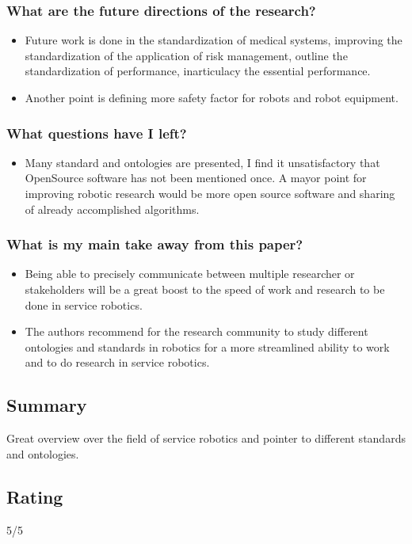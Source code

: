     \subsubsection*{What are the future directions of the research?}
    \begin{itemize}
        \item Future work is done in the standardization of medical systems, improving the standardization of the application of risk management, outline the standardization of performance, inarticulacy the essential performance.
        \item Another point is defining more safety factor for robots and robot equipment.
    \end{itemize}
    \subsubsection*{What questions have I left?}
    \begin{itemize}
        \item Many standard and ontologies are presented, I find it unsatisfactory that OpenSource software has not been mentioned once. A mayor point for improving robotic research would be more open source software and sharing of already accomplished algorithms.
    \end{itemize}
    \subsubsection*{What is my main take away from this paper?}
    \begin{itemize}
        \item Being able to precisely communicate between multiple researcher or stakeholders will be a great boost to the speed of work and research to be done in service robotics.
        \item The authors recommend for the research community to study different ontologies and standards in robotics for a more streamlined ability to work and to do research in service robotics.
    \end{itemize}
    
    \subsection*{Summary}
    Great overview over the field of service robotics and pointer to different standards and ontologies.
    
    \subsection*{Rating}
    5/5

